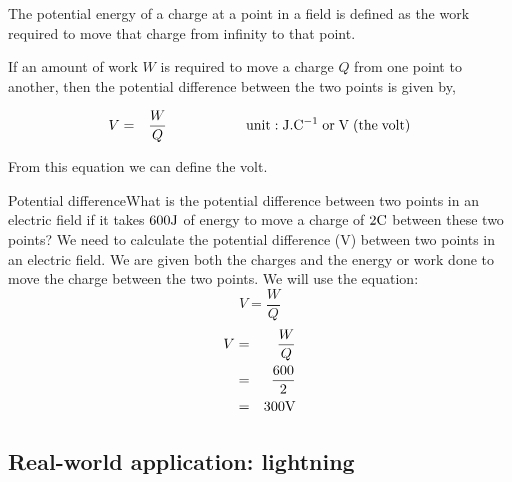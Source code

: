 The potential energy of a charge at
a point in a field is defined as the work required to move that
charge from infinity to that point.

If an amount of work $W$ is required to move a charge
$Q$ from one point to another, then the potential difference
between the two points is given by,

\begin{eqnarray}
V &=&{W\over Q}\nonumber\hspace{2cm}
\mathrm{unit:J.C^{-1}\;or\;V\;(the\;volt)}
\end{eqnarray}

From this equation we can define the volt.


\begin{wex}{Potential difference}{What is the potential difference between two points in an electric field if it takes $600 {\rm J}$ of energy to move a charge of $2 {\rm C}$ between these two points?}{ 
We need to calculate the potential difference (V) between two points in an electric field.
We are given both the charges and the energy or work done to move the charge between the two points.
We will use the equation:\\
\begin{equation*}
V=\frac{W}{Q}
\end{equation*}
\begin{eqnarray*}
V &=& \frac{W}{Q}\\
&=& \frac {600}{2}\\
&=& 300 {\rm V}\\
\end{eqnarray*}}
\end{wex}



\subsection{Real-world application: lightning}

